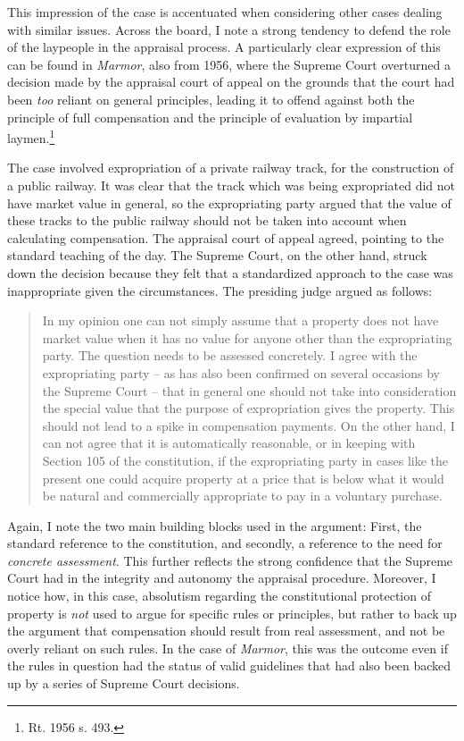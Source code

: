 This impression of the case is accentuated when considering other cases dealing with similar issues. Across the board, I note a strong  tendency to defend the role of the laypeople in the appraisal process. A particularly clear expression of this can be found in \emph{Marmor}, also from 1956, where the Supreme Court overturned a decision made by the appraisal court of appeal on the grounds that the court had been {\it too} reliant on general principles, leading it to offend against both the principle of full compensation and the principle of evaluation by impartial laymen.\footnote{Rt. 1956 s. 493.} 

The case involved expropriation of a private railway track, for the construction of a public railway. It was clear that the track which was being expropriated did not have market value in general, so the expropriating party argued that the value of these tracks to the public railway should not be taken into account when calculating compensation. The appraisal court of appeal agreed, pointing to the standard teaching of the day. The Supreme Court, on the other hand, struck down the decision because they felt that a standardized approach to the case was inappropriate given the circumstances. The presiding judge argued as follows:

\begin{quote}
In my opinion one can not simply assume that a property does not have market value when it has no value for anyone other than the expropriating party. The question needs to be assessed concretely. I agree with the expropriating party -- as has also been confirmed on several occasions by the Supreme Court -- that in general one should not take into consideration the special value that the purpose of expropriation gives the property. This should not lead to a spike in compensation payments. On the other hand, I can not agree that it is automatically reasonable, or in keeping with Section 105 of the constitution, if the expropriating party in cases like the present one could acquire property at a price that is below what it would be natural and commercially appropriate to pay in a voluntary purchase.
\end{quote}

Again, I note the two main building blocks used in the argument: First, the standard reference to the constitution, and secondly, a reference to the need for \emph{concrete assessment}. This further reflects the strong confidence that the Supreme Court had in the integrity and autonomy the appraisal procedure. Moreover, I notice how, in this case, absolutism regarding the constitutional protection of property is \emph{not} used to argue for specific rules or principles, but rather to back up the argument that compensation should result from real assessment, and not be overly reliant on such rules. In the case of {\it Marmor}, this was the outcome even if the rules in question had the status of valid guidelines that had also been backed up by a series of Supreme Court decisions.

